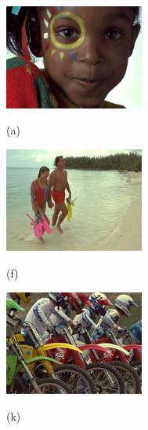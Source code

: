 	\begin{figure}[!]
		\centering
		\begin{minipage}[t]{.32\linewidth}
			\includegraphics[width=1.8in]{TID/I15.jpg}
			\centerline{(a)}
		\end{minipage}
		\begin{minipage}[t]{.32\linewidth}
			\includegraphics[width=1.8in]{TID/I12.jpg}
			\centerline{(f)}
		\end{minipage}
		\begin{minipage}[t]{.32\linewidth}
			\includegraphics[width=1.8in]{TID/I05.jpg}
			\centerline{(k)}
		\end{minipage}
		

\end{figure}
